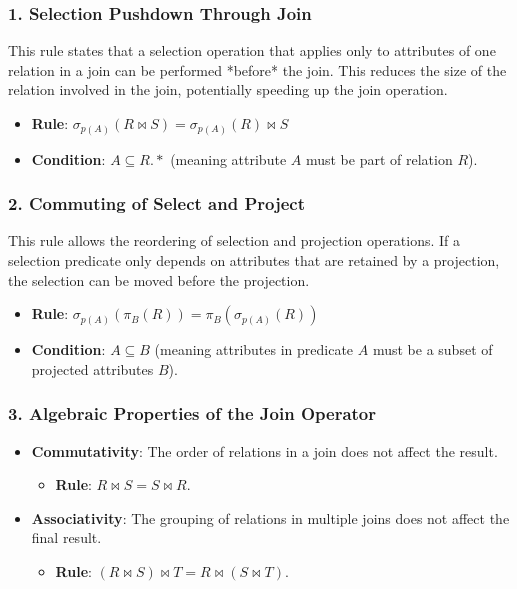 \documentclass{article}
\newcommand{\sel}{\sigma} %
\newcommand{\proj}{\pi} %
\newcommand{\join}{\bowtie} %
\begin{document}
\subsubsection*{1. Selection Pushdown Through Join}
This rule states that a selection operation that applies only to attributes of one relation in a join can be performed *before* the join. This reduces the size of the relation involved in the join, potentially speeding up the join operation.
\begin{itemize}
    \item \textbf{Rule}: $\sel_{p(A)}(R \join S) = \sel_{p(A)}(R) \join S$ 
    \item \textbf{Condition}: $A \subseteq R.\ast$ (meaning attribute $A$ must be part of relation $R$).
\end{itemize}

\subsubsection*{2. Commuting of Select and Project}
This rule allows the reordering of selection and projection operations. If a selection predicate only depends on attributes that are retained by a projection, the selection can be moved before the projection.
\begin{itemize}
    \item \textbf{Rule}: $\sel_{p(A)}(\proj_{B}(R)) = \proj_{B}(\sel_{p(A)}(R))$ 
    \item \textbf{Condition}: $A \subseteq B$ (meaning attributes in predicate $A$ must be a subset of projected attributes $B$).
\end{itemize}

\subsubsection*{3. Algebraic Properties of the Join Operator}
\begin{itemize}
    \item \textbf{Commutativity}: The order of relations in a join does not affect the result.
        \begin{itemize}
            \item \textbf{Rule}: $R \join S = S \join R$.
        \end{itemize}
    \item \textbf{Associativity}: The grouping of relations in multiple joins does not affect the final result.
        \begin{itemize}
            \item \textbf{Rule}: $(R \join S) \join T = R \join (S \join T)$.
        \end{itemize}
\end{itemize}
\end{document}
